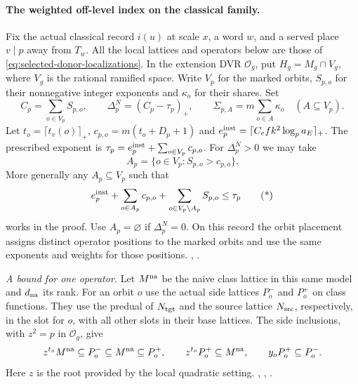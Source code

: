 \paragraph{The weighted off-level index on the classical family.}
\leavevmode{}%
Fix the actual classical record \(i(u)\) at scale \(x\), a word
\(w\), and a served place \(v\mid p\) away from \(T_w\). All the
local lattices and operators below are those of
\eqref{eq:selected-donor-localizations}. In the extension DVR
\(\mathcal O_g\), put \(H_g=M_g\cap V_g\), where
\(V_g\) is the rational ramified space. Write \(V_p\) for the
marked orbits, \(S_{p,o}\) for their nonnegative integer
exponents and \(\kappa_o\) for their shares. Set
\[
 C_p=\sum_{o\in V_p} S_{p,o},\qquad
 \Delta_p^N=(C_p-\tau_p)_+,\qquad
 \Sigma_{p,A}=m\sum_{o\in A}\kappa_o \quad (A\subseteq V_p).
\]
Let \(t_o=\lceil t_v(o)\rceil_+\), \(c_{p,o}=m(t_o+D_p+1)\) and
\(e_p^{\rm inst}=\lceil C_e f k^2\log_p a_E\rceil_+\). The prescribed exponent is
\(\tau_p=e_p^{\rm inst}+\sum_{o\in V_p}c_{p,o}\).
For \(\Delta_p^N>0\) we may take
\[
 A_p=\{o\in V_p:S_{p,o}>c_{p,o}\}.
\]
More generally any \(A_p\subseteq V_p\) such that
\[
 e_p^{\rm inst}+\sum_{o\in A_p}c_{p,o}
       +\sum_{o\in V_p\setminus A_p}S_{p,o}\le \tau_p
 \tag{*}
\]
works in the proof. Use \(A_p=\varnothing\) if \(\Delta_p^N=0\).
On this record the orbit placement assigns distinct operator
positions to the marked orbits and use the same exponents and weights
for those positions.
,
.

\emph{A bound for one operator.}
Let \(M^{\rm na}\) be the naive class lattice in this same model and
\(d_{\rm na}\) its rank. For an orbit \(o\) use the actual side
lattices \(P_o^-\) and \(P_o^+\) on class functions. They use the
predual of \(N_{\rm tgt}\) and the source lattice \(N_{\rm src}\),
respectively, in the slot for \(o\), with all other slots in their
base lattices. The side inclusions, with \(z^2=p\) in
\(\mathcal O_g\), give
\[
 z^{t_o} M^{\rm na}\subseteq P_o^-\subseteq M^{\rm na}
   \subseteq P_o^+,\qquad
 z^{t_o}P_o^+\subseteq M^{\rm na},\qquad
 y_o P_o^+\subseteq P_o^-.
\]
Here \(z\) is the root provided by the local quadratic setting.
,
,
.

